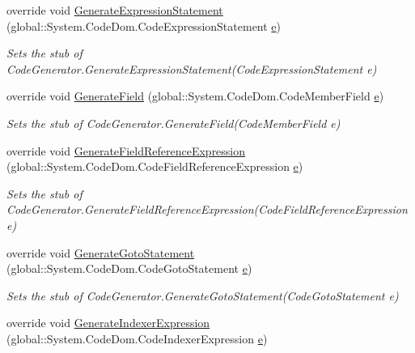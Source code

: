 \begin{DoxyCompactItemize}
override void \hyperlink{class_system_1_1_code_dom_1_1_compiler_1_1_fakes_1_1_stub_code_generator_a284f9551e564c3a632ff1e33eeb760bc}{Generate\-Expression\-Statement} (global\-::\-System.\-Code\-Dom.\-Code\-Expression\-Statement \hyperlink{jquery-1_810_82_8min_8js_a2c038346d47955cbe2cb91e338edd7e1}{e})
\begin{DoxyCompactList}\small\item\em Sets the stub of Code\-Generator.\-Generate\-Expression\-Statement(\-Code\-Expression\-Statement e)\end{DoxyCompactList}\item 
override void \hyperlink{class_system_1_1_code_dom_1_1_compiler_1_1_fakes_1_1_stub_code_generator_a8a7949ad0578cddc4995e37a359aaad4}{Generate\-Field} (global\-::\-System.\-Code\-Dom.\-Code\-Member\-Field \hyperlink{jquery-1_810_82_8min_8js_a2c038346d47955cbe2cb91e338edd7e1}{e})
\begin{DoxyCompactList}\small\item\em Sets the stub of Code\-Generator.\-Generate\-Field(\-Code\-Member\-Field e)\end{DoxyCompactList}\item 
override void \hyperlink{class_system_1_1_code_dom_1_1_compiler_1_1_fakes_1_1_stub_code_generator_a380ad9295c8ee0a69982ba4f5e513e91}{Generate\-Field\-Reference\-Expression} (global\-::\-System.\-Code\-Dom.\-Code\-Field\-Reference\-Expression \hyperlink{jquery-1_810_82_8min_8js_a2c038346d47955cbe2cb91e338edd7e1}{e})
\begin{DoxyCompactList}\small\item\em Sets the stub of Code\-Generator.\-Generate\-Field\-Reference\-Expression(\-Code\-Field\-Reference\-Expression e)\end{DoxyCompactList}\item 
override void \hyperlink{class_system_1_1_code_dom_1_1_compiler_1_1_fakes_1_1_stub_code_generator_a9ec0e27530456014180a369a68b40ab5}{Generate\-Goto\-Statement} (global\-::\-System.\-Code\-Dom.\-Code\-Goto\-Statement \hyperlink{jquery-1_810_82_8min_8js_a2c038346d47955cbe2cb91e338edd7e1}{e})
\begin{DoxyCompactList}\small\item\em Sets the stub of Code\-Generator.\-Generate\-Goto\-Statement(\-Code\-Goto\-Statement e)\end{DoxyCompactList}\item 
override void \hyperlink{class_system_1_1_code_dom_1_1_compiler_1_1_fakes_1_1_stub_code_generator_a12f97e86fec0daaead5594e550817cdf}{Generate\-Indexer\-Expression} (global\-::\-System.\-Code\-Dom.\-Code\-Indexer\-Expression \hyperlink{jquery-1_810_82_8min_8js_a2c038346d47955cbe2cb91e338edd7e1}{e})

\end{DoxyCompactItemize}
